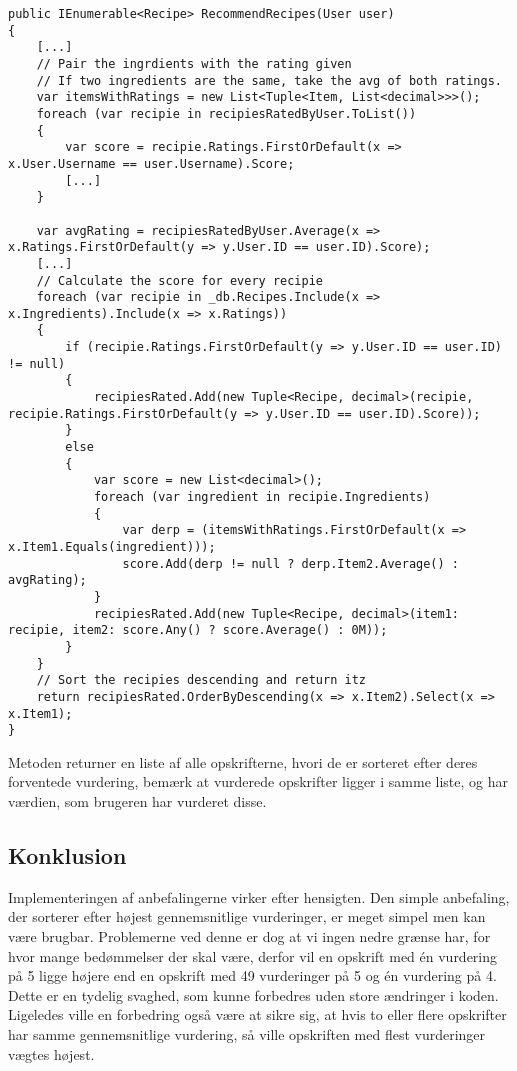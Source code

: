 \begin{lstlisting}[caption=Metoden RecommendRecipes. Sorterer opskrifter efter forventede vurdering for en given bruger.", label=recommendrecipes]
public IEnumerable<Recipe> RecommendRecipes(User user)
{
    [...]
    // Pair the ingrdients with the rating given
    // If two ingredients are the same, take the avg of both ratings.
    var itemsWithRatings = new List<Tuple<Item, List<decimal>>>();
    foreach (var recipie in recipiesRatedByUser.ToList())
    {
        var score = recipie.Ratings.FirstOrDefault(x => x.User.Username == user.Username).Score;
        [...]
    }

    var avgRating = recipiesRatedByUser.Average(x => x.Ratings.FirstOrDefault(y => y.User.ID == user.ID).Score);
    [...]
    // Calculate the score for every recipie
    foreach (var recipie in _db.Recipes.Include(x => x.Ingredients).Include(x => x.Ratings))
    {
        if (recipie.Ratings.FirstOrDefault(y => y.User.ID == user.ID) != null)
        {
            recipiesRated.Add(new Tuple<Recipe, decimal>(recipie, recipie.Ratings.FirstOrDefault(y => y.User.ID == user.ID).Score));
        }
        else
        {
            var score = new List<decimal>();
            foreach (var ingredient in recipie.Ingredients)
            {
                var derp = (itemsWithRatings.FirstOrDefault(x => x.Item1.Equals(ingredient)));
                score.Add(derp != null ? derp.Item2.Average() : avgRating);
            }
            recipiesRated.Add(new Tuple<Recipe, decimal>(item1: recipie, item2: score.Any() ? score.Average() : 0M));
        }
    }
    // Sort the recipies descending and return itz
    return recipiesRated.OrderByDescending(x => x.Item2).Select(x => x.Item1);
}
\end{lstlisting}

Metoden returner en liste af alle opskrifterne, hvori de er sorteret efter deres forventede vurdering, bemærk at vurderede opskrifter ligger i samme liste, og har værdien, som brugeren har vurderet disse.

\subsection{Konklusion}
Implementeringen af anbefalingerne virker efter hensigten.
Den simple anbefaling, der sorterer efter højest gennemsnitlige vurderinger, er meget simpel men kan være brugbar.
Problemerne ved denne er dog at vi ingen nedre grænse har, for hvor mange bedømmelser der skal være, derfor vil en opskrift med én vurdering på 5 ligge højere end en opskrift med 49 vurderinger på 5 og én vurdering på 4.
Dette er en tydelig svaghed, som kunne forbedres uden store ændringer i koden.
Ligeledes ville en forbedring også være at sikre sig, at hvis to eller flere opskrifter har samme gennemsnitlige vurdering, så ville opskriften med flest vurderinger vægtes højest.

